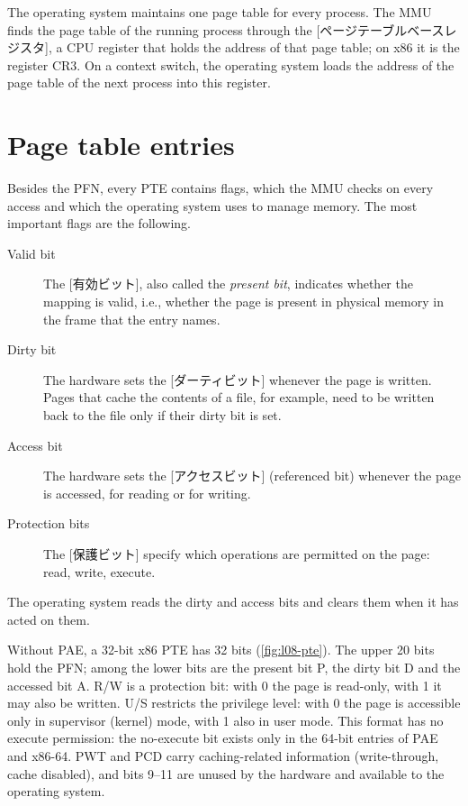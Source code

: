 \documentclass[../main.tex]{subfiles}
\begin{document}
The operating system maintains one page table for every process.  The MMU
finds the page table of the running process through the
[ページテーブルベースレジスタ], a CPU
register that holds the address of that page table; on x86 it is the
register CR3.  On a context switch, the operating system loads the address
of the page table of the next process into this register.

\section{Page table entries}
\label{sec:l08-pte}

Besides the PFN, every PTE contains flags, which the MMU checks
on every access and which the operating system uses to manage memory.  The
most important flags are the following.
\begin{description}
  \item[Valid bit] The [有効ビット], also called the
    \emph{present bit}, indicates whether the mapping is valid, i.e.,
    whether the page is present in physical memory in the frame that the
    entry names.
  \item[Dirty bit] The hardware sets the [ダーティビット]
    whenever the page is written.  Pages that cache the contents of a file,
    for example, need to be written back to the file only if their dirty
    bit is set.
  \item[Access bit] The hardware sets the [アクセスビット]
    (referenced bit) whenever the page is accessed, for reading or for
    writing.
  \item[Protection bits] The [保護ビット] specify
    which operations are permitted on the page: read, write, execute.
\end{description}
The operating system reads the dirty and access bits and clears them when
it has acted on them.

Without PAE, a 32-bit x86 PTE has 32 bits (\cref{fig:l08-pte}).  The upper
20 bits hold the PFN; among the lower bits are the present bit P, the dirty
bit D and the accessed bit A.  R/W is a protection bit: with 0 the page is
read-only, with 1 it may also be written.  U/S restricts the privilege
level: with 0 the page is accessible only in supervisor (kernel) mode, with
1 also in user mode.  This format has no execute permission: the
no-execute bit exists only in the 64-bit entries of PAE and x86-64.  PWT and PCD carry caching-related information
(write-through, cache disabled), and bits 9--11 are unused by the hardware
and available to the operating system.
\end{document}
